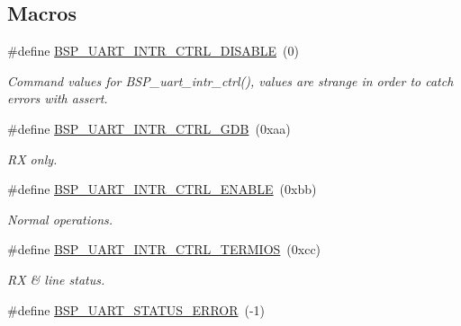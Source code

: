 \subsection*{Macros}
\begin{DoxyCompactItemize}
\item 
\mbox{\label{group__i386__uart_ga8142ba6d8f45432b262dcf99175cd6fa}} 
\#define \mbox{\hyperlink{group__i386__uart_ga8142ba6d8f45432b262dcf99175cd6fa}{B\+S\+P\+\_\+\+U\+A\+R\+T\+\_\+\+I\+N\+T\+R\+\_\+\+C\+T\+R\+L\+\_\+\+D\+I\+S\+A\+B\+LE}}~(0)
\begin{DoxyCompactList}\small\item\em Command values for B\+S\+P\+\_\+uart\+\_\+intr\+\_\+ctrl(), values are strange in order to catch errors with assert. \end{DoxyCompactList}\item 
\mbox{\label{group__i386__uart_gadb9bed084cf016296bd0fb2516aea4b0}} 
\#define \mbox{\hyperlink{group__i386__uart_gadb9bed084cf016296bd0fb2516aea4b0}{B\+S\+P\+\_\+\+U\+A\+R\+T\+\_\+\+I\+N\+T\+R\+\_\+\+C\+T\+R\+L\+\_\+\+G\+DB}}~(0xaa)
\begin{DoxyCompactList}\small\item\em RX only. \end{DoxyCompactList}\item 
\mbox{\label{group__i386__uart_ga110396dbcbd2e1a17bbf98bb8132a577}} 
\#define \mbox{\hyperlink{group__i386__uart_ga110396dbcbd2e1a17bbf98bb8132a577}{B\+S\+P\+\_\+\+U\+A\+R\+T\+\_\+\+I\+N\+T\+R\+\_\+\+C\+T\+R\+L\+\_\+\+E\+N\+A\+B\+LE}}~(0xbb)
\begin{DoxyCompactList}\small\item\em Normal operations. \end{DoxyCompactList}\item 
\mbox{\label{group__i386__uart_ga5bed54027da262e73f07daf1d850ec1e}} 
\#define \mbox{\hyperlink{group__i386__uart_ga5bed54027da262e73f07daf1d850ec1e}{B\+S\+P\+\_\+\+U\+A\+R\+T\+\_\+\+I\+N\+T\+R\+\_\+\+C\+T\+R\+L\+\_\+\+T\+E\+R\+M\+I\+OS}}~(0xcc)
\begin{DoxyCompactList}\small\item\em RX \& line status. \end{DoxyCompactList}\item 
\#define \mbox{\hyperlink{group__i386__uart_ga57197a9e8404913bbbde4a23a78cbcff}{B\+S\+P\+\_\+\+U\+A\+R\+T\+\_\+\+S\+T\+A\+T\+U\+S\+\_\+\+E\+R\+R\+OR}}~(-\/1)

\end{DoxyCompactItemize}
